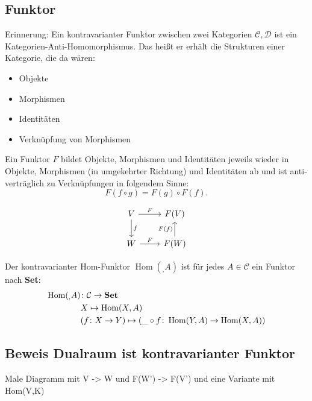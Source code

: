 \documentclass[a4paper]{amsart}
\theoremstyle{definition}
\DeclareMathOperator{\Hom}{Hom}
\begin{document}
\subsection{Funktor}
Erinnerung: Ein kontravarianter Funktor zwischen zwei Kategorien $\mathcal{C, D}$ ist ein Kategorien-Anti-Homomorphismus. Das heißt er erhält die Strukturen einer Kategorie, die da wären:
\begin{itemize}
	\item Objekte
	\item Morphismen
	\item Identitäten
	\item Verknüpfung von Morphismen
\end{itemize} 
Ein Funktor $F$ bildet Objekte, Morphismen und Identitäten jeweils wieder in Objekte, Morphismen (in umgekehrter Richtung) und Identitäten ab und ist anti-verträglich zu Verknüpfungen in folgendem Sinne:
\begin{equation}
	F( f \circ g ) = F( g ) \circ F(  f ).
\end{equation}

\begin{equation}
   \begin{tikzcd}
      V \arrow[r, "F"] \arrow[d, "f"] & F(V)\\
      W \arrow[r, "F"]                & F(W) \arrow[u, "F(f)"]
   \end{tikzcd}
\end{equation}

Der kontravarianter Hom-Funktor $\Hom( _, A)$ ist für jedes $A \in \mathcal{C}$ ein Funktor nach \textbf{Set}:
\begin{align}
   \Hom( _, A) &\colon \mathcal{C} \to \text{\textbf{Set}}\\
   &X \mapsto \Hom( X, A)\\
   &(f \colon X \to Y ) \mapsto (\_ \circ f \colon \Hom( Y, A) \to \Hom( X, A))
\end{align}

\subsection{Beweis Dualraum ist kontravarianter Funktor}
Male Diagramm mit V -> W und F(W') -> F(V') und eine Variante mit Hom(V,K)
\end{document}
